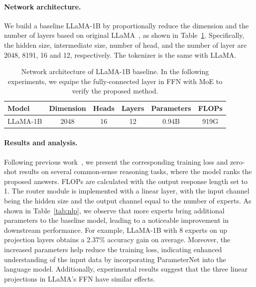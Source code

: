 \documentclass[10pt,twocolumn,letterpaper]{article}
\begin{document}
\paragraph{Network architecture.}
We build a baseline LLaMA-1B by proportionally reduce the dimension and the number of layers based on original LLaMA~\cite{llama}, as shown in Table~\ref{tab:llama}. Specifically, the hidden size, intermediate size, number of head, and the number of layer are 2048, 8191, 16 and 12, respectively. The tokenizer is the same with LLaMA.

\begin{table}[htb]
	\centering
	\small
	\renewcommand\arraystretch{1.1}
	\caption{Network architecture of LLaMA-1B baseline. In the following experiments, we equipe the fully-connected layer in FFN with MoE to verify the proposed method.}
	\label{tab:llama}
	\setlength{\tabcolsep}{3pt}
	\begin{tabular}{l|ccccc}
		\toprule[1.5pt]
		Model & Dimension & Heads & Layers & Parameters & FLOPs \\
		\midrule
		LLaMA-1B & 2048 & 16 & 12 & 0.94B & 919G \\
		\bottomrule[1pt]
	\end{tabular}
	\vspace{-1em}	
\end{table}

\paragraph{Results and analysis.}
Following previous work~\cite{brown2020language}, we present the corresponding training loss and zero-shot results on several common-sense reasoning tasks, where the model ranks the proposed answers. FLOPs are calculated with the output response length set to 1. The router module is implemented with a linear layer, with the input channel being the hidden size and the output channel equal to the number of experts. As shown in Table~\ref{tab:nlp}, we observe that more experts bring additional parameters to the baseline model, leading to a noticeable improvement in downstream performance. For example, LLaMA-1B with 8 experts on up projection layers obtains a 2.37\% accuracy gain on average. Moreover, the increased parameters help reduce the training loss, indicating enhanced understanding of the input data by incorporating ParameterNet into the language model. Additionally, experimental results suggest that the three linear projections in LLaMA's FFN have similar effects.
\end{document}
